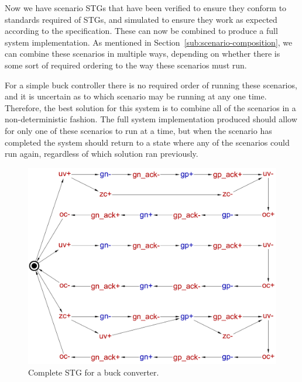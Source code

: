 \documentclass[british,compsoc]{IEEEtran}
\begin{document}

Now we have scenario STGs that have been verified to ensure they conform
to standards required of STGs, and simulated to ensure they work as
expected according to the specification. These can now be combined
to produce a full system implementation. As mentioned in Section~\ref{sub:scenario-composition},
we can combine these scenarios in multiple ways, depending on whether
there is some sort of required ordering to the way these scenarios
must run.

For a simple buck controller there is no required order of running
these scenarios, and it is uncertain as to which scenario may be running
at any one time. Therefore, the best solution for this system is to
combine all of the scenarios in a non-deterministic fashion. The full
system implementation produced should allow for only one of these
scenarios to run at a time, but when the scenario has completed the
system should return to a state where any of the scenarios could run
again, regardless of which solution ran previously.

\begin{figure}[t]
\begin{centering}
\includegraphics[scale=0.22]{Images/stg-buck-scenarios_merged}
\par\end{centering}

\begin{centering}
\protect\caption{\label{fig:buck STG}Complete STG for a buck converter.}

\par\end{centering}

\end{figure}
\end{document}
